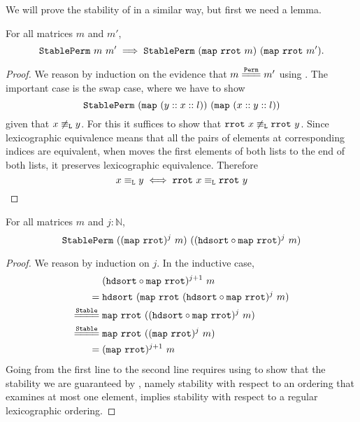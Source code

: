 \documentclass[sigplan,10pt,anonymous,review]{thesis}
\begin{document}
We will prove the stability of  in a similar way, but
first we need a lemma.
\begin{lemma}
  For all matrices $m$ and $m'$,
  \begin{equation*}
    \texttt{\textup{StablePerm}}~m~m' \implies
    \texttt{\textup{StablePerm}}~(\texttt{\textup{map}}~\texttt{\textup{rrot}}~m)~(\texttt{\textup{map}}~\texttt{\textup{rrot}}~m').
  \end{equation*}
\end{lemma}
\begin{proof}
  We reason by induction on the evidence that $m \eqperm m'$
  using . The important case is the swap case,
  where we have to show
  \begin{equation*}
    \texttt{\textup{StablePerm}}~(\texttt{\textup{map}}~(y :: x :: l))~(\texttt{\textup{map}}~(x :: y :: l))
  \end{equation*}
  given that $x \not\equiv_{\texttt{\textup{L}}} y$. For this it suffices to show that
  $\texttt{\textup{rrot}}~x \not\equiv_{\texttt{\textup{L}}} \texttt{\textup{rrot}}~y$. Since lexicographic
  equivalence means that all the pairs of elements at corresponding
  indices are equivalent, when  moves the first elements of
  both lists to the end of both lists, it preserves lexicographic
  equivalence. Therefore
  \begin{equation*}
    x \equiv_{\texttt{\textup{L}}} y \iff \texttt{\textup{rrot}}~x \equiv_{\texttt{\textup{L}}} \texttt{\textup{rrot}}~y \qedhere
  \end{equation*}
\end{proof}

\begin{lemma}
  For all matrices $m$ and $j : \mathbb{N}$,
  \begin{equation*}
    \texttt{\textup{StablePerm}}~((\texttt{\textup{map}}~\texttt{\textup{rrot}})^j~m)~
                     ((\texttt{\textup{hdsort}} \circ \texttt{\textup{map}}~\texttt{\textup{rrot}})^j~m)
  \end{equation*}
\end{lemma}
\begin{proof}
  We reason by induction on $j$. In the inductive case,
  \begin{align*}
    {}& (\var{hdsort} \comp \var{map}~\var{rrot})^{j+1}~m \\
    ={}&\var{hdsort}~(\var{map}~\var{rrot}~(\var{hdsort} \comp
    \var{map}~\var{rrot})^j~m) \\
    \eqstable{}& \var{map}~\var{rrot}~((\var{hdsort} \comp
    \var{map}~\var{rrot})^j~m) \\
    \eqstable{}& \var{map}~\var{rrot}~((\var{map}~\var{rrot})^j~m) \\
    ={}& (\var{map}~\var{rrot})^{j+1}~m
  \end{align*}
  Going from the first line to the second line requires using
   to show that the stability we are
  guaranteed by , namely stability with respect to an
  ordering that examines at most one element, implies stability with
  respect to a regular lexicographic ordering.
\end{proof}
\end{document}
